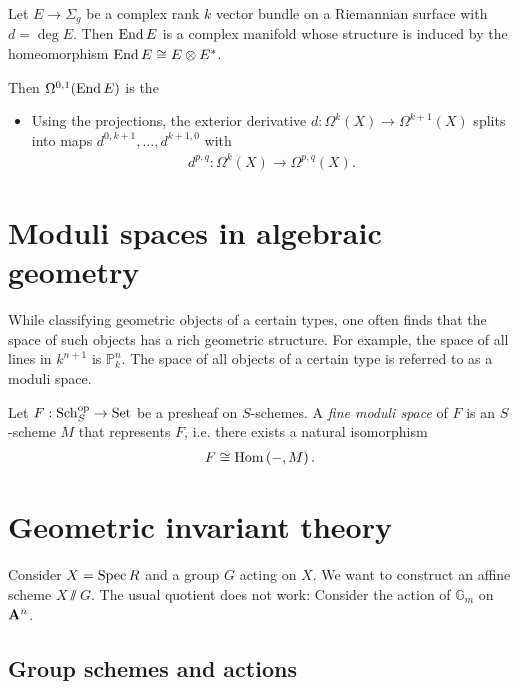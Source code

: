 \documentclass{article}
\begin{document}
\begin{example}
  Let $E\to\Sigma_g$ be a complex rank $k$ vector bundle
  on a Riemannian surface with $d=\deg E$. Then $\operatorname{End} E$ is
  a complex manifold whose structure is induced by the
  homeomorphism $\operatorname{End} E \cong E\otimes E^*$.

  Then $\Omega^{0,1}(\operatorname{End} E)$ is the
\end{example}

\begin{itemize}
  \item Using the projections, the exterior derivative $d:\Omega^k(X)\to\Omega^{k+1}(X)$ splits into maps $d^{0,k+1},\ldots,d^{k+1,0}$ with
    \begin{align*}
      d^{p,q} : \Omega^k(X) \to \Omega^{p,q}(X).
    \end{align*}
\end{itemize}

\section{Moduli spaces in algebraic geometry}

While classifying geometric objects of a certain types, one often
finds that the space of such objects has a rich geometric structure.
For example, the space of all lines in $k^{n+1}$ is
$\mathbb{P}^n_k$. The space of all objects of a certain type is referred
to as a moduli space. \cite{bejleri2020}

\begin{definition}
  Let $F:{\operatorname{Sch}}^\text{op}_S\to\operatorname{Set}$ be a presheaf on $S$-schemes.
  A \emph{fine moduli space} of $F$ is an $S$-scheme $M$ that
  represents $F$, i.e. there exists a natural isomorphism
  \begin{align*}
    F \cong \operatorname{Hom}\left({-,M}\right).
  \end{align*}
\end{definition}

\section{Geometric invariant theory}

Consider $X=\operatorname{Spec} R$ and a group $G$ acting on $X$. We want to construct
an affine scheme $X \sslash G$. The usual quotient does not work:
Consider the action of $\mathbb{G}_m$ on $\mathbf{A}^{n}_{}$.


\subsection{Group schemes and actions}
\end{document}
